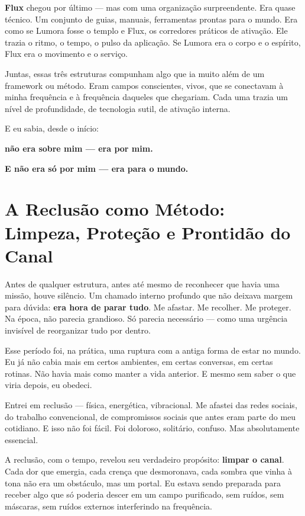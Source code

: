 \documentclass[12pt,a4paper]{book}
\begin{document}
\textbf{Flux} chegou por último --- mas com uma organização surpreendente. Era quase técnico. Um conjunto de guias, manuais, ferramentas prontas para o mundo. Era como se Lumora fosse o templo e Flux, os corredores práticos de ativação. Ele trazia o ritmo, o tempo, o pulso da aplicação. Se Lumora era o corpo e o espírito, Flux era o movimento e o serviço.

Juntas, essas três estruturas compunham algo que ia muito além de um framework ou método. Eram campos conscientes, vivos, que se conectavam à minha frequência e à frequência daqueles que chegariam. Cada uma trazia um nível de profundidade, de tecnologia sutil, de ativação interna.

E eu sabia, desde o início:

\textbf{não era sobre mim --- era por mim.}

\textbf{E não era só por mim --- era para o mundo.}

\section{A Reclusão como Método: Limpeza, Proteção e Prontidão do Canal}

Antes de qualquer estrutura, antes até mesmo de reconhecer que havia uma missão, houve silêncio. Um chamado interno profundo que não deixava margem para dúvida: \textbf{era hora de parar tudo}. Me afastar. Me recolher. Me proteger. Na época, não parecia grandioso. Só parecia necessário --- como uma urgência invisível de reorganizar tudo por dentro.

Esse período foi, na prática, uma ruptura com a antiga forma de estar no mundo. Eu já não cabia mais em certos ambientes, em certas conversas, em certas rotinas. Não havia mais como manter a vida anterior. E mesmo sem saber o que viria depois, eu obedeci.

Entrei em reclusão --- física, energética, vibracional. Me afastei das redes sociais, do trabalho convencional, de compromissos sociais que antes eram parte do meu cotidiano. E isso não foi fácil. Foi doloroso, solitário, confuso. Mas absolutamente essencial.

A reclusão, com o tempo, revelou seu verdadeiro propósito: \textbf{limpar o canal}. Cada dor que emergia, cada crença que desmoronava, cada sombra que vinha à tona não era um obstáculo, mas um portal. Eu estava sendo preparada para receber algo que só poderia descer em um campo purificado, sem ruídos, sem máscaras, sem ruídos externos interferindo na frequência.
\end{document}
